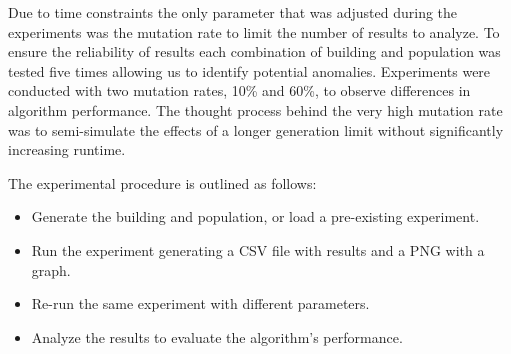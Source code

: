 Due to time constraints the only parameter that was adjusted during the experiments was the mutation rate to limit the number of results to analyze.
To ensure the reliability of results each combination of building and population was tested five times allowing us to identify potential anomalies. Experiments were conducted with two mutation rates, 10\% and 60\%, to observe differences in algorithm performance.
The thought process behind the very high mutation rate was to semi-simulate the effects of a longer generation limit without significantly increasing runtime.

The experimental procedure is outlined as follows:

\begin{itemize}
	\item Generate the building and population, or load a pre-existing experiment.
    \item Run the experiment generating a CSV file with results and a PNG with a graph.
    \item Re-run the same experiment with different parameters.
	\item Analyze the results to evaluate the algorithm's performance.
\end{itemize}
